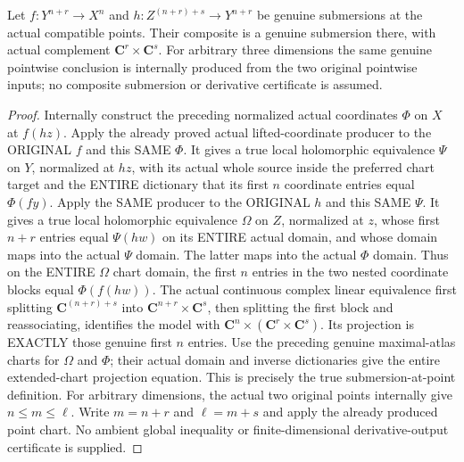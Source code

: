 \begin{theorem}
\label{hir:submersion-composition-actual-point-chart}
\leanok
{}
Let $f:Y^{n+r}\to X^n$ and $h:Z^{(n+r)+s}\to Y^{n+r}$ be genuine
submersions at the actual compatible points. Their composite is a genuine
submersion there, with actual complement $\mathbf C^r\times\mathbf C^s$.
For arbitrary three dimensions the same genuine pointwise conclusion is
internally produced from the two original pointwise inputs; no composite
submersion or derivative certificate is assumed.
\end{theorem}
\begin{proof}
Internally construct the preceding normalized actual coordinates $\Phi$
on $X$ at $f(hz)$. Apply the already proved actual lifted-coordinate
producer to the ORIGINAL $f$ and this SAME $\Phi$. It gives a true local
holomorphic equivalence $\Psi$ on $Y$, normalized at $hz$, with its actual
whole source inside the preferred chart target and the ENTIRE dictionary
that its first $n$ coordinate entries equal $\Phi(fy)$. Apply the SAME
producer to the ORIGINAL $h$ and this SAME $\Psi$. It gives a true local
holomorphic equivalence $\Omega$ on $Z$, normalized at $z$, whose first
$n+r$ entries equal $\Psi(hw)$ on its ENTIRE actual domain, and whose
domain maps into the actual $\Psi$ domain. The latter maps into the actual
$\Phi$ domain. Thus on the ENTIRE $\Omega$ chart domain, the first $n$
entries in the two nested coordinate blocks equal $\Phi(f(hw))$.
The actual continuous complex linear equivalence first splitting
$\mathbf C^{(n+r)+s}$ into $\mathbf C^{n+r}\times\mathbf C^s$, then splitting
the first block and reassociating, identifies the model with
$\mathbf C^n\times(\mathbf C^r\times\mathbf C^s)$. Its projection is EXACTLY
those genuine first $n$ entries. Use the preceding genuine maximal-atlas
charts for $\Omega$ and $\Phi$; their actual domain and inverse dictionaries
give the entire extended-chart projection equation. This is precisely the
true submersion-at-point definition. For arbitrary dimensions, the actual
two original points internally give $n\le m\le\ell$. Write $m=n+r$ and
$\ell=m+s$ and apply the already produced point chart. No ambient global
inequality or finite-dimensional derivative-output certificate is supplied.
\end{proof}

